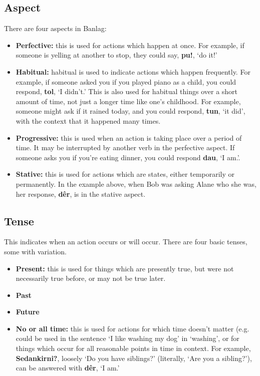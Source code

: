 \documentclass[12pt]{report}
\begin{document}
\subsection{Aspect}
There are four aspects in Banlag:

\begin{itemize}
\item \textbf{Perfective:} this is used for actions which happen at once. For example, if someone is yelling at another to stop, they could say, \textbf{pu!}, `do it!'
\item \textbf{Habitual:} habitual is used to indicate actions which happen frequently. For example, if someone asked you if you played piano as a child, you could respond, \textbf{tol}, `I didn't.' This is also used for habitual things over a short amount of time, not just a longer time like one's childhood. For example, someone might ask if it rained today, and you could respond, \textbf{tun}, `it did', with the context that it happened many times.
\item \textbf{Progressive:} this is used when an action is taking place over a period of time. It may be interrupted by another verb in the perfective aspect. If someone asks you if you're eating dinner, you could respond \textbf{dau}, `I am.'.
\item \textbf{Stative:} this is used for actions which are states, either temporarily or permanently. In the example above, when Bob was asking Alane who she was, her response, \textbf{d\^er}, is in the stative aspect.
\end{itemize}

\subsection{Tense}
This indicates when an action occurs or will occur. There are four basic tenses, some with variation.

\begin{itemize}
\item \textbf{Present:} this is used for things which are presently true, but were not necessarily true before, or may not be true later.
\item \textbf{Past}
\item \textbf{Future}
\item \textbf{No or all time:} this is used for actions for which time doesn't matter (e.g. could be used in the sentence `I like washing my dog' in `washing', or for things which occur for all reasonable points in time in context. For example, \textbf{Sedankirni?}, loosely `Do you have siblings?' (literally, `Are you a sibling?'), can be answered with \textbf{d\^er}, `I am.'
\end{itemize}
\end{document}
